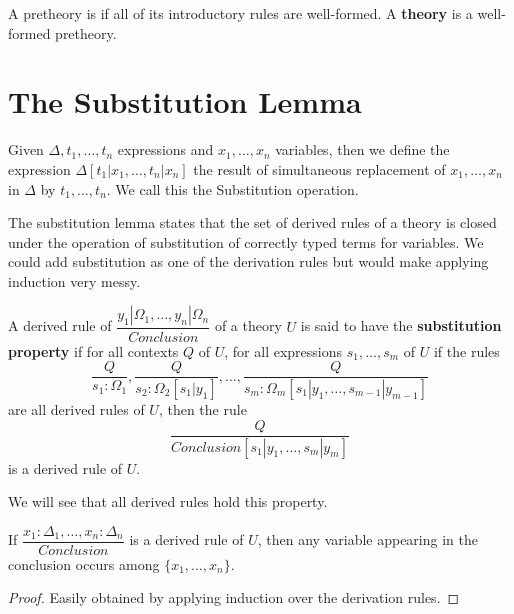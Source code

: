 \begin{definition}
    A pretheory is  if all of its introductory
    rules are well-formed.
    A \textbf{theory} is a well-formed pretheory.
\end{definition}

\section{The Substitution Lemma}

Given $\Delta, t_1, \dots, t_n$ expressions and $x_1, \dots, x_n$ variables,
then we define the expression $\Delta[t_1 | x_1, \dots, t_n | x_n]$
the result of simultaneous replacement of $x_1, \dots, x_n$ in $\Delta$
by $t_1, \dots, t_n$. We call this the Substitution operation.

The substitution lemma states that the set of derived rules of 
a theory is closed under the operation of substitution of
correctly typed terms for variables. 
We could add substitution as one of the derivation rules
but would make applying induction very messy.

\begin{definition}
    A derived rule of $\dfrac{y_1 | \Omega_1, \dots, y_n | \Omega_n}{Conclusion}$
    of a theory $U$ is said to have the \textbf{substitution property}
    if for all contexts $Q$ of $U$, for all expressions $s_1, \dots, s_m$ of $U$
    if the rules
    \begin{equation*}
        \dfrac{Q}{s_1 : \Omega_1},
        \dfrac{Q}{s_2 : \Omega_2[s_1 | y_1]},
        \dots,
        \dfrac{Q}{s_m : \Omega_m[s_1 | y_1, \dots, s_{m-1} | y_{m-1}]}
    \end{equation*}
    are all derived rules of $U$, then the rule 
    \begin{equation*}
        \dfrac{Q}{Conclusion[s_1 | y_1, \dots, s_m | y_m]}
    \end{equation*}
    is a derived rule of $U$.
\end{definition}

We will see that all derived rules hold this property.

\begin{lemma}
    If $\dfrac{x_1 : \Delta_1, \dots, x_n : \Delta_n}{Conclusion}$
    is a derived rule of $U$, then any variable appearing in the conclusion
    occurs among $\{ x_1, \dots, x_n \}$.
\end{lemma}
\begin{proof}
    Easily obtained by applying induction over the derivation rules.
\end{proof}

